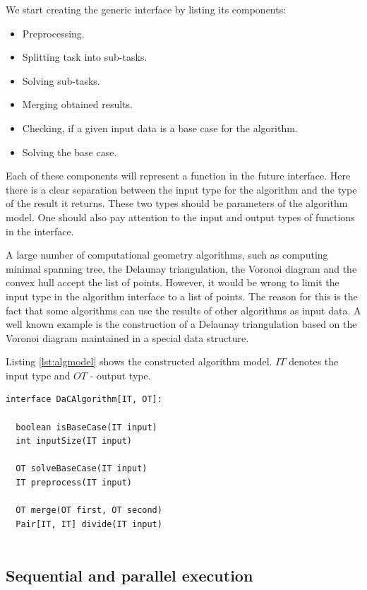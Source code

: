 \documentclass[conference]{IEEEtran}
\theoremstyle{plane}
\begin{document}
		We start creating the generic interface by listing its components:
		
		\begin{itemize}
			\item 
			Preprocessing.
			\item 
			Splitting task into sub-tasks.
			\item 
			Solving sub-tasks.
			\item 
			Merging obtained results.
			\item 
			Checking, if a given input data is a base case for the algorithm.
			\item 
			Solving the base case.
		\end{itemize}
		
		Each of these components will represent a function in the future interface. Here there is a clear separation between the input type for the algorithm and the type of the result it returns. These two types should be parameters of the algorithm model. One should also pay attention to the input and output types of functions  in the interface.
		
		A large number of computational geometry algorithms, such as computing minimal spanning tree, the Delaunay triangulation, the Voronoi diagram and the convex hull accept the list of points. However, it would be wrong to limit the input type in the algorithm interface to a list of points. The reason for this is the fact that some algorithms can use the results of other algorithms as input data. A well known example is the construction of a Delaunay triangulation based on the Voronoi diagram maintained in a special data structure.
		
		Listing \ref{lst:algmodel} shows the constructed algorithm model. $IT$ denotes the input type and $OT$ - output type.
		
		\begin{lstlisting}[caption={Algorithm model based on the ``divide-and-conquer'' principle},label={lst:algmodel},captionpos=b]
interface DaCAlgorithm[IT, OT]:

  boolean isBaseCase(IT input)
  int inputSize(IT input)
  
  OT solveBaseCase(IT input)
  IT preprocess(IT input)
  
  OT merge(OT first, OT second)
  Pair[IT, IT] divide(IT input)
  
		\end{lstlisting}
		

\subsection{Sequential and parallel execution}
\end{document}
